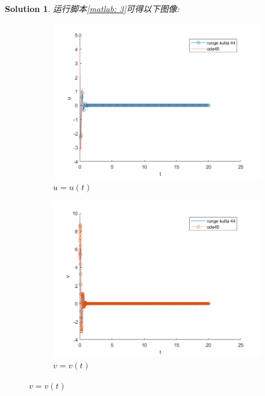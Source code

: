 \documentclass[a4paper, 12pt]{ctexart}
\theoremstyle{plain}
\theoremstyle{plain}
\theoremstyle{plain}
\theoremstyle{nonumberplain}
\newtheorem{solution}{Solution}
\begin{document}
    \begin{solution}
        运行脚本\ref{matlab: 3}可得以下图像:
        \begin{figure}[H]
            \centering
            \begin{subfigure}[b]{0.3\textwidth}
                \centering
                \includegraphics[width=\textwidth]{wc31.png}
                \caption{$u=u(t)$}
            \end{subfigure}
            \hfill
            \begin{subfigure}[b]{0.3\textwidth}
                \centering
                \includegraphics[width=\textwidth]{wc32.png}
                \caption{$v=v(t)$}
            \end{subfigure}

\end{figure}
\end{solution}
\end{document}
